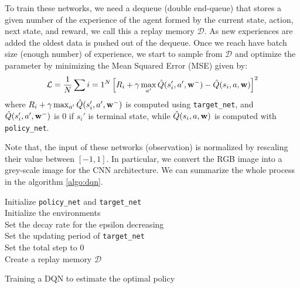 To train these networks, we need a dequeue (double end-queue) that stores a given number of the experience of the agent formed by the current state, action, next state, and reward, we call this a replay memory $\mathcal{D}$. As new experiences are added the oldest data is pushed out of the dequeue.
Once we reach have batch size (enough number) of experience, we start to sample from $\mathcal{D}$ and optimize the  parameter by minimizing the Mean Squared Error (MSE) given by:
\begin{equation}
	\mathcal{L} = \frac{1}{N}\sum{i=1}^{N}\left[R_i + \gamma\max_{a'}\hat{Q}(s_i', a', \mathbf{w}^{-}) - \hat{Q}(s_i, a, \mathbf{w})\right]^2
\end{equation}
where $R_i + \gamma\max_{a'}\hat{Q}(s_i', a', \mathbf{w}^{-})$ is computed using \texttt{target\_net}, and $\hat{Q}(s_i', a', \mathbf{w}^{-})$ is $0$ if $s_i'$ is terminal state, while $\hat{Q}(s_i, a, \mathbf{w})$ is computed with \texttt{policy\_net}.


Note that, the input of these networks (observation) is normalized by rescaling their value between $[-1,1]$. In particular, we convert the RGB image into a grey-scale image for the CNN architecture.
We can summarize the whole process in the algorithm \ref{algo:dqn}.
\begin{algorithm}
	Initialize \texttt{policy\_net} and \texttt{target\_net}\\
	Initialize the environments\\
	Set the decay rate for the epsilon decreasing\\
	Set the updating period of \texttt{target\_net}\\
	Set the total step to $0$\\
	Create a replay memory $\mathcal{D}$\\
	\caption{Training a DQN to estimate the optimal policy}
	\label{algo:dqn}
\end{algorithm}
